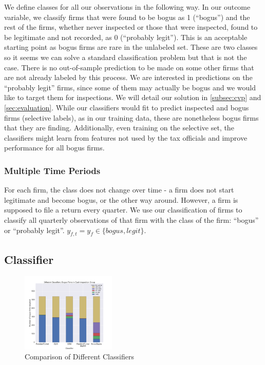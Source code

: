 We define classes for all our observations in the following way. In our outcome variable, we classify firms that were found to be bogus as 1 (``bogus'') and the rest of the firms, whether never inspected or those that were inspected, found to be legitimate and not recorded, as 0 (``probably legit''). This is an acceptable starting point as bogus firms are rare in the unlabeled set. These are two classes so it seems we can solve a standard classification problem but that is not the case. There is no out-of-sample prediction to be made on some other firms that are not already labeled by this process. We are interested in predictions on the ``probably legit'' firms, since some of them may actually be bogus and we would like to target them for inspections. We will detail our solution in \cref{subsec:cvp} and \cref{sec:evaluation}. While our classifiers would fit to predict inspected and bogus firms (selective labels), as in our training data, these are nonetheless bogus firms that they are finding. Additionally, even training on the selective set, the classifiers might learn from features not used by the tax officials and improve performance for all bogus firms.

\subsubsection{Multiple Time Periods}
\label{subsubsec:multiple-time}
For each firm, the class does not change over time - a firm does not start legitimate and become bogus, or the other way around. However, a firm is supposed to file a return every quarter. We use our classification of firms to classify all quarterly observations of that firm with the class of the firm: ``bogus'' or ``probably legit''. $y_{f,t}=y_f \in \{bogus,legit\}$.


\subsection{Classifier}
\label{subsec:classifier}

\begin{figure}
  \includegraphics[width=0.4\textwidth, page=1]{figures/DifferentClassifiersPerformanceByInspectionGroup.png}
  \caption{Comparison of Different Classifiers}
  \label{fig:differentclassifiers}
\end{figure}

